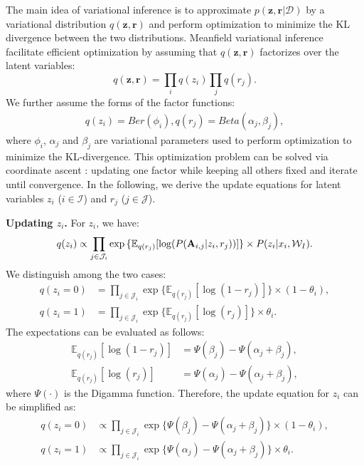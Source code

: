 The main idea of variational inference \cite{tzikas2008variational} is to approximate $p(\mathbf{z},\mathbf{r} | \mathcal{D})$ by a variational distribution $q(\mathbf{z},\mathbf{r})$ and perform optimization to minimize the KL divergence between the two distributions. Meanfield variational inference facilitate efficient optimization by assuming that $q(\mathbf{z},\mathbf{r})$  factorizes over the latent variables:
\begin{equation}
    q(\mathbf{z},\mathbf{r})=\prod_{i} q(z_i) \prod_j q(r_j).
    \label{eq:dist_fact}
\end{equation}
%
We further assume the forms of the factor functions:
\begin{align}
    q(z_i)=Ber(\phi_i), q(r_j)=Beta(\alpha_j,\beta_j),
\end{align}
%
where $\phi_i$, $\alpha_j$ and $\beta_j$ are variational parameters used to perform optimization to minimize the KL-divergence. This optimization problem can be solved via coordinate ascent \cite{blei2017variational}: updating one factor while keeping all others fixed and iterate until convergence. In the following, we derive the update equations for latent variables $z_i$ ($i\in\mathcal{I}$) and $r_j$ ($j\in\mathcal{J}$).

\smallskip
\noindent\textbf{Updating $z_i$.} For $z_i$, we have:
%
\begin{equation}
q(z_i)    \propto \prod_{j \in \mathcal{J}_{i}} \exp{\{\mathbb{E}_{q(r_j)}[\log (P(\mathbf{A}_{i,j}|z_i,r_j))]\}}   \times P(z_i|x_i, \mathcal{W}_I). \\
\end{equation}
%
We distinguish among the two cases:
%
\begin{align}
    q(z_i=0)   &= \prod_{j \in \mathcal{J}_{i}} \exp{\{\mathbb{E}_{q(r_j)}[\log (1-r_j)]\}}\times (1-\theta_i) \nonumber, \\
    q(z_i=1)   &= \prod_{j \in \mathcal{J}_{i}} \exp{\{\mathbb{E}_{q(r_j)}[\log (r_j)]\}}\times \theta_i .
\label{eq:q_two_poss}                
\end{align}
%
The expectations can be evaluated as follows:
\begin{align}
    \mathbb{E}_{q(r_j)}[\log (1-r_j)]&= \Psi(\beta_j)-\Psi(\alpha_j+\beta_j), \nonumber \\
    \mathbb{E}_{q(r_j)}[\log (r_j)]&= \Psi(\alpha_j)-\Psi(\alpha_j+\beta_j),
    \label{eq:expect}
\end{align}
where $\Psi(\cdot)$ is the Digamma function. Therefore, the update equation for $z_i$ can be simplified as:
\begin{align}
    q(z_i=0)   &\propto \prod_{j \in \mathcal{J}_{i}} \exp{\{\Psi(\beta_j)-\Psi(\alpha_j+\beta_j)\}}\times (1-\theta_i), \nonumber \\  
     q(z_i=1)    &\propto \prod_{j \in \mathcal{J}_{i}} \exp{\{ \Psi(\alpha_j)-\Psi(\alpha_j+\beta_j)\}}\times \theta_i  .
     \label{eq:qzi}
\end{align}

